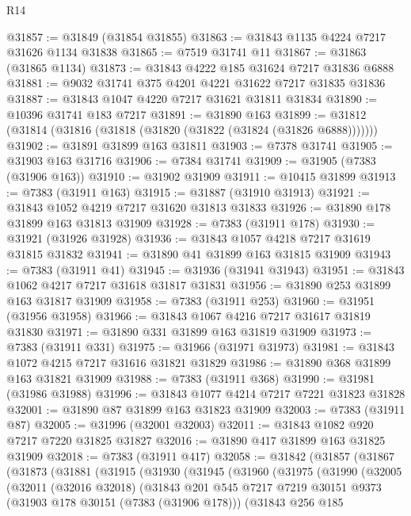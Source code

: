 \begin{lexlean}{R14}
\begin{coremodule}
@31857 := @31849 (@31854 @31855)
@31863 := @31843 @1135 @4224 @7217 @31626 @1134 @31838
@31865 := @7519 @31741 @11
@31867 := @31863 (@31865 @1134)
@31873 := @31843 @4222 @185 @31624 @7217 @31836 @6888
@31881 := @9032 @31741 @375 @4201 @4221 @31622 @7217 @31835 @31836
@31887 := @31843 @1047 @4220 @7217 @31621 @31811 @31834
@31890 := @10396 @31741 @183 @7217
@31891 := @31890 @163
@31899 := @31812 (@31814 (@31816 (@31818 (@31820 (@31822 (@31824 (@31826 @6888)))))))
@31902 := @31891 @31899 @163 @31811
@31903 := @7378 @31741
@31905 := @31903 @163 @31716
@31906 := @7384 @31741
@31909 := @31905 (@7383 (@31906 @163))
@31910 := @31902 @31909
@31911 := @10415 @31899
@31913 := @7383 (@31911 @163)
@31915 := @31887 (@31910 @31913)
@31921 := @31843 @1052 @4219 @7217 @31620 @31813 @31833
@31926 := @31890 @178 @31899 @163 @31813 @31909
@31928 := @7383 (@31911 @178)
@31930 := @31921 (@31926 @31928)
@31936 := @31843 @1057 @4218 @7217 @31619 @31815 @31832
@31941 := @31890 @41 @31899 @163 @31815 @31909
@31943 := @7383 (@31911 @41)
@31945 := @31936 (@31941 @31943)
@31951 := @31843 @1062 @4217 @7217 @31618 @31817 @31831
@31956 := @31890 @253 @31899 @163 @31817 @31909
@31958 := @7383 (@31911 @253)
@31960 := @31951 (@31956 @31958)
@31966 := @31843 @1067 @4216 @7217 @31617 @31819 @31830
@31971 := @31890 @331 @31899 @163 @31819 @31909
@31973 := @7383 (@31911 @331)
@31975 := @31966 (@31971 @31973)
@31981 := @31843 @1072 @4215 @7217 @31616 @31821 @31829
@31986 := @31890 @368 @31899 @163 @31821 @31909
@31988 := @7383 (@31911 @368)
@31990 := @31981 (@31986 @31988)
@31996 := @31843 @1077 @4214 @7217 @7221 @31823 @31828
@32001 := @31890 @87 @31899 @163 @31823 @31909
@32003 := @7383 (@31911 @87)
@32005 := @31996 (@32001 @32003)
@32011 := @31843 @1082 @920 @7217 @7220 @31825 @31827
@32016 := @31890 @417 @31899 @163 @31825 @31909
@32018 := @7383 (@31911 @417)
@32058 := @31842
    (@31857
      (@31867
        (@31873
          (@31881
            (@31915
              (@31930
                (@31945
                  (@31960
                    (@31975
                      (@31990
                        (@32005
                          (@32011
                            (@32016 @32018)
                            (@31843
                              @201
                              @545
                              @7217
                              @7219
                              @30151
                              @9373
                              (@31903 @178 @30151 (@7383 (@31906 @178)))
                              (@31843
                                @256
                                @185

\end{coremodule}
\end{lexlean}
